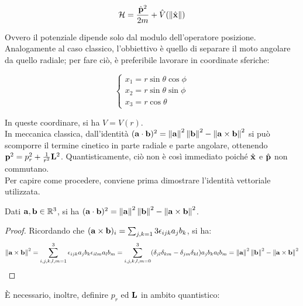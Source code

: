 \begin{equation}
	\mathcal{H} = \frac{\hat{\mathbf{p}}^2}{2m} + \hat{V}(\left\lVert\hat{\mathbf{x}}\right\rVert)
	\label{eq:27}
\end{equation}

Ovvero il potenziale dipende solo dal modulo dell'operatore posizione.\\
Analogamente al caso classico, l'obbiettivo è quello di separare il moto angolare da quello radiale; per fare ciò, è preferibile lavorare in coordinate sferiche:

\begin{equation}
	\begin{cases}
		x_1 = r \sin \theta \cos \phi \\
		x_2 = r \sin \theta \sin \phi \\
		x_3 = r \cos \theta
	\end{cases}
	\label{eq:28}
\end{equation}

In queste coordinare, si ha $ V = V(r) $.\\
In meccanica classica, dall'identità $ (\mathbf{a}\cdot\mathbf{b})^2 = \left\lVert\mathbf{a}\right\rVert^2 \left\lVert\mathbf{b}\right\rVert^2 - \left\lVert\mathbf{a}\times\mathbf{b}\right\rVert^2 $ si può scomporre il termine cinetico in parte radiale e parte angolare, ottenendo $ \mathbf{p}^2 = p_r^2 + \frac{1}{r^2}\mathbf{L}^2 $. Quantisticamente, ciò non è così immediato poiché $ \hat{\mathbf{x}} $ e $ \hat{\mathbf{p}} $ non commutano.\\
Per capire come procedere, conviene prima dimostrare l'identità vettoriale utilizzata.

\begin{proposition}\label{cross-class}
	Dati $ \mathbf{a}, \mathbf{b} \in\mathbb{R}^3 $, si ha $ (\mathbf{a}\cdot\mathbf{b})^2 = \left\lVert\mathbf{a}\right\rVert^2 \left\lVert\mathbf{b}\right\rVert^2 - \left\lVert\mathbf{a}\times\mathbf{b}\right\rVert^2 $.
\end{proposition}
\begin{proof}
	Ricordando che $ (\mathbf{a}\times\mathbf{b})_i = \sum_{j,k = 1}{3} \epsilon_{ijk} a_j b_k $, si ha:
	\begin{equation*}
		\left\lVert\mathbf{a}\times\mathbf{b}\right\rVert^2 = \sum_{i,j,k,l,m = 1}^{3} \epsilon_{ijk} a_j b_k \epsilon_{ilm} a_l b_m = \sum_{i,j,k,l,m = 0}^{3} (\delta_{jl}\delta_{km} - \delta_{jm}\delta_{kl}) a_j b_k a_l b_m = \left\lVert\mathbf{a}\right\rVert^2 \left\lVert\mathbf{b}\right\rVert^2 - \left\lVert\mathbf{a}\times\mathbf{b}\right\rVert^2
	\end{equation*}
\end{proof}

È necessario, inoltre, definire $ p_r $ ed $ \mathbf{L} $ in ambito quantistico:

